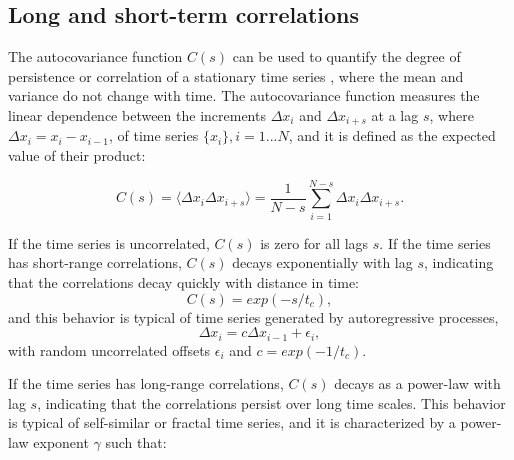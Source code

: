 
\subsection{Long and short-term correlations}

The autocovariance function $C(s)$ can be used to quantify the degree of persistence or correlation of a stationary time series \cite{kantelhardt2008fractal}, where the mean and variance do not change with time. The autocovariance function measures the linear dependence between the increments $\Delta x_i$ and $\Delta x_{i+s}$ at a lag $s$, where $\Delta x_i = x_i - x_{i-1}$, of time series $\{x_i\}, i=1...N$, and it is defined as the expected value of their product:

\begin{equation}
C(s) = \langle \Delta x_i \Delta x_{i+s} \rangle = \frac{1}{N-s} \sum_{i=1}^{N-s}\Delta x_i \Delta x_{i+s}.
\end{equation}

If the time series is uncorrelated, $C(s)$ is zero for all lags $s$. If the time series has short-range correlations, $C(s)$ decays exponentially with lag $s$, indicating that the correlations decay quickly with distance in time:
$$C(s) = exp(-s/t_c),$$
and this behavior is typical of time series generated by autoregressive processes,
$$ \Delta x_i = c\Delta x_{i-1} + \epsilon_i ,$$
with random uncorrelated offsets $\epsilon_i$ and $c = exp(-1/t_c)$.
 
 If the time series has long-range correlations, $C(s)$ decays as a power-law with lag $s$, indicating that the correlations persist over long time scales. This behavior is typical of self-similar or fractal time series, and it is characterized by a power-law exponent $\gamma$ such that:
 
